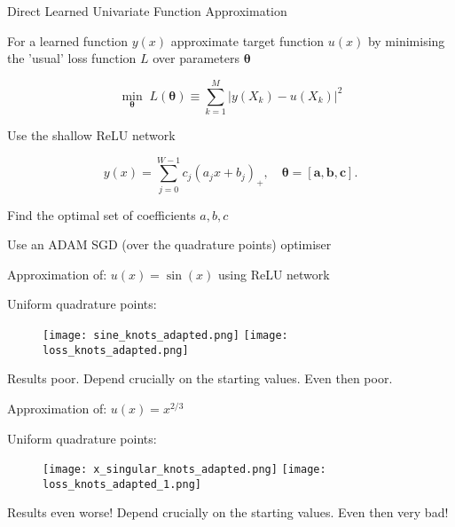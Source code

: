 \documentclass{beamer}
\begin{document}
\begin{frame}{Direct Learned Univariate Function Approximation}

For a learned function $y(x)$ approximate target function $u(x)$ by minimising the 'usual' loss function $L$
over parameters ${\mathbf \theta}$

$$\min_{\mathbf \theta} \; L({\mathbf \theta}) \equiv \sum_{k=1}^M |y(X_k) - u(X_k)|^2$$

Use the shallow ReLU network

$$y(x) = \sum_{j=0}^{W-1} c_j (a_j x + b_j)_+, \quad {\mathbf \theta} = [{\mathbf a}, {\mathbf b}, {\mathbf c}].$$


\vspace{0.1in}

\begin{center}
{\color{blue} Find the optimal set of coefficients $a,b,c$}
\end{center} 

\vspace{0.1in}

Use an ADAM SGD (over the quadrature points) optimiser

\end{frame}

\begin{frame}{Approximation of: $u(x) = \sin(x)$ using ReLU network}

Uniform quadrature points:


    \begin{figure}
    \centering
    \texttt{[image: sine\_knots\_adapted.png]}
     \texttt{[image: loss\_knots\_adapted.png]}
    \end{figure}
    
    Results {\color{red} poor}. Depend crucially on the starting values. Even then poor.
\end{frame}

\begin{frame}{Approximation of: $u(x) = x^{2/3}$}

Uniform quadrature points:


    \begin{figure}
    \centering
    \texttt{[image: x\_singular\_knots\_adapted.png]}
     \texttt{[image: loss\_knots\_adapted\_1.png]}
    \end{figure}
    
    Results even worse! Depend crucially on the starting values. Even then very bad!
\end{frame}
\end{document}
